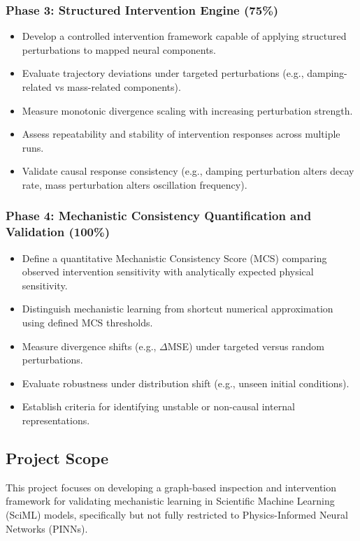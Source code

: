 \documentclass[12pt,singleside,a4paper]{article}
\begin{document}
\subsubsection*{Phase 3: Structured Intervention Engine (75\%)}

\begin{itemize}
    \item Develop a controlled intervention framework capable of applying structured perturbations to mapped neural components.
    \item Evaluate trajectory deviations under targeted perturbations (e.g., damping-related vs mass-related components).
    \item Measure monotonic divergence scaling with increasing perturbation strength.
    \item Assess repeatability and stability of intervention responses across multiple runs.
    \item Validate causal response consistency (e.g., damping perturbation alters decay rate, mass perturbation alters oscillation frequency).
\end{itemize}

\subsubsection*{Phase 4: Mechanistic Consistency Quantification and Validation (100\%)}

\begin{itemize}
    \item Define a quantitative Mechanistic Consistency Score (MCS) comparing observed intervention sensitivity with analytically expected physical sensitivity.
    \item Distinguish mechanistic learning from shortcut numerical approximation using defined MCS thresholds.
    \item Measure divergence shifts (e.g., $\Delta$MSE) under targeted versus random perturbations.
    \item Evaluate robustness under distribution shift (e.g., unseen initial conditions).
    \item Establish criteria for identifying unstable or non-causal internal representations.
\end{itemize}
\subsection{Project Scope}

This project focuses on developing a graph-based inspection and intervention framework for validating mechanistic learning in Scientific Machine Learning (SciML) models, specifically but not fully restricted to  Physics-Informed Neural Networks (PINNs).
\end{document}
